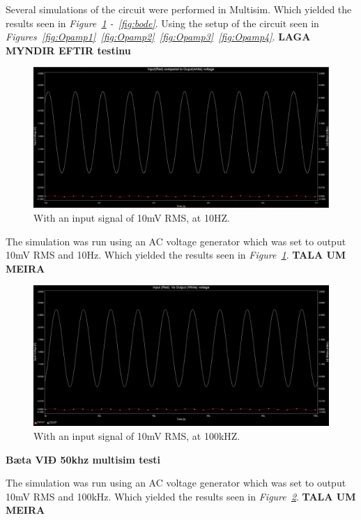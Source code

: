 Several simulations of the circuit were performed in Multisim.
Which yielded the results seen in \textit{Figure~\ref{fig:InpVsOut10} -~\ref{fig:bode}}.
Using the setup of the circuit seen in \textit{Figures~\ref{fig:Opamp1}~\ref{fig:Opamp2}~\ref{fig:Opamp3}~\ref{fig:Opamp4}}. 
\textbf{LAGA MYNDIR EFTIR testinu}

\begin{figure}[h]
    \centering
    \includegraphics[width=1.0\textwidth]{graphics/InpVsOut10hz.png}
    \caption{With an input signal of 10mV RMS, at 10HZ.}
    \label{fig:InpVsOut10}
\end{figure}

The simulation was run using an AC voltage generator which was set to output 10mV RMS and 10Hz.
Which yielded the results seen in \textit{Figure~\ref{fig:InpVsOut10}}.
\textbf{TALA UM MEIRA}

\begin{figure}[h]
    \centering
    \includegraphics[width=1.0\textwidth]{graphics/InpVsOut100khz.png}
    \caption{With an input signal of 10mV RMS, at 100kHZ.}
    \label{fig:InpVsOut100k}
\end{figure}

\textbf{Bæta VIÐ 50khz multisim testi}

The simulation was run using an AC voltage generator which was set to output 10mV RMS and 100kHz.
Which yielded the results seen in \textit{Figure~\ref{fig:InpVsOut100k}}.
\textbf{TALA UM MEIRA}




